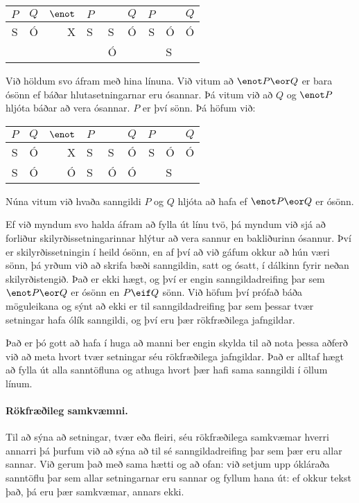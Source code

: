 \begin{center}
	\begin{tabular}{c c|d e e f | d e f}
		$P$&$Q$&$\enot$&$P\;$&\eor&$Q$&$P$&\eif&$Q$\\
		\hline
		 S & Ó & X & S & S & Ó & S & Ó & Ó\\
		 &  & & & Ó & & & S &
	\end{tabular}
\end{center}
Við höldum svo áfram með hina línuna. Við vitum að $\enot P \eor Q$ er bara ósönn ef báðar hlutasetningarnar eru ósannar. Þá vitum við að $Q$ og $\enot P$ hljóta báðar að vera ósannar. $P$ er því sönn. Þá höfum við:

\begin{center}
	\begin{tabular}{c c|d e e f | d e f}
		$P$&$Q$&$\enot$&$P\;$&\eor&$Q$&$P$&\eif&$Q$\\
		\hline
		 S & Ó & X & S & S & Ó & S & Ó & Ó\\
		 S & Ó & Ó & S & Ó & Ó & & S &
	\end{tabular}
\end{center}
Núna vitum við hvaða sanngildi $P$ og $Q$ hljóta að hafa ef $\enot P \eor Q$ er ósönn. 

Ef við myndum svo halda áfram að fylla út línu tvö, þá myndum við sjá að forliður skilyrðissetningarinnar hlýtur að vera sannur en bakliðurinn ósannur. Því er skilyrðissetningin í heild ósönn, en af því að við gáfum okkur að hún væri sönn, þá yrðum við að skrifa bæði sanngildin, satt og ósatt, í dálkinn fyrir neðan skilyrðistengið. Það er ekki hægt, og því er engin sanngildadreifing þar sem $\enot P \eor Q$ er ósönn en $P \eif Q$ sönn. Við höfum því prófað báða möguleikana og sýnt að ekki er til sanngildadreifing þar sem þessar tvær setningar hafa ólík sanngildi, og því eru þær rökfræðilega jafngildar.

Það er þó gott að hafa í huga að manni ber engin skylda til að nota þessa aðferð við að meta hvort tvær setningar séu rökfræðilega jafngildar. Það er alltaf hægt að fylla út alla sanntöfluna og athuga hvort þær hafi sama sanngildi í öllum línum.

\paragraph{Rökfræðileg samkvæmni.}

Til að sýna að setningar, tvær eða fleiri, séu rökfræðilega samkvæmar hverri annarri þá þurfum við að sýna að til sé sanngildadreifing þar sem þær eru allar sannar. Við gerum það með sama hætti og að ofan: við setjum upp ókláraða sanntöflu þar sem allar setningarnar eru sannar og fyllum hana út: ef okkur tekst það, þá eru þær samkvæmar, annars ekki.

